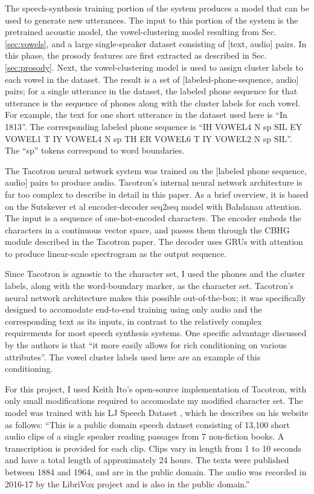 \documentclass{article}
\begin{document}
The speech-synthesis training portion of the system produces a model that can be used to generate new utterances. The input to this portion of the system is the pretrained acoustic model, the vowel-clustering model resulting from Sec. \ref{sec:vowels}, and a large single-speaker dataset consisting of [text, audio] pairs.
In this phase, the prosody features are first extracted as described in Sec. \ref{sec:prosody}. Next, the vowel-clustering model is used to assign cluster labels to each vowel in the dataset.
The result is a set of [labeled-phone-sequence, audio] pairs; for a single utterance in the dataset, the labeled phone sequence for that utterance is the sequence of phones along with the cluster labels for each vowel. For example, the text for one short utterance in the dataset used here is ``In 1813''.
The corresponding labeled phone sequence is ``IH VOWEL4 N sp SIL EY VOWEL1 T IY VOWEL4 N sp TH ER VOWEL6 T IY VOWEL2 N sp SIL''. The ``sp'' tokens correspond to word boundaries.

The Tacotron \cite{wang2017tacotron} neural network system was trained on the [labeled phone sequence, audio] pairs to produce audio.
Tacotron's internal neural network architecture is far too complex to describe in detail in this paper. As a brief overview, it is based on the Sutskever et al \cite{sutskever2014sequence} encoder-decoder seq2seq model with Bahdanau \cite{bahdanau2014neural} attention. The input is a sequence of one-hot-encoded characters.
The encoder embeds the characters in a continuous vector space, and passes them through the CBHG module described in the Tacotron paper.
The decoder uses GRUs with attention to produce linear-scale spectrogram as the output sequence.

Since Tacotron is agnostic to the character set, I used the phones and the cluster labels, along with the word-boundary marker, as the character set. Tacotron's neural network architecture makes this possible out-of-the-box; it was specifically designed to accomodate end-to-end training using only audio and the corresponding text as its inputs, in contrast to the relatively complex requirements for most speech synthesis systems.
One specific advantage discussed by the authors is that ``it more easily
allows for rich conditioning on various attributes''. The vowel cluster labels used here are an example of this conditioning.

For this project, I used Keith Ito's open-source implementation of Tacotron, with only small modifications required to accomodate my modified character set. The model was trained with his LJ Speech Dataset \cite{ljspeech17}, which he describes on his website as follows:
``This is a public domain speech dataset consisting of 13,100 short audio clips of a single speaker reading passages from 7 non-fiction books. A transcription is provided for each clip. Clips vary in length from 1 to 10 seconds and have a total length of approximately 24 hours. The texts were published between 1884 and 1964, and are in the public domain. The audio was recorded in 2016-17 by the LibriVox project and is also in the public domain.''
\end{document}
